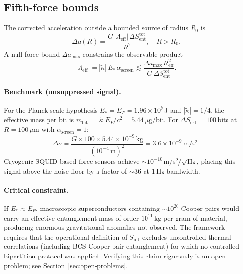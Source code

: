 \documentclass[11pt]{article}
\begin{document}
\subsection{Fifth-force bounds}

The corrected acceleration outside a bounded source of radius $R_0$ is
\begin{equation}
\Delta a(R) = \frac{G\,|\Lambda_{\mathrm{eff}}|\,\Delta S_{\mathrm{ent}}^{\mathrm{tot}}}{R^2},
\quad R > R_0.
\end{equation}
A null force bound $\Delta a_{\max}$ constrains the observable product
\begin{equation}
|\Lambda_{\mathrm{eff}}|
= |\tilde{\kappa}|\,E_*\,\alpha_{\mathrm{screen}}
\lesssim \frac{\Delta a_{\max}\,R_{\mathrm{eff}}^2}{G\,\Delta S_{\mathrm{ent}}^{\mathrm{tot}}}.
\label{eq:Lambda-bound}
\end{equation}

\paragraph{Benchmark (unsuppressed signal).}
For the Planck-scale hypothesis $E_* = E_P = 1.96\times10^9$\,J and $|\tilde{\kappa}| = 1/4$, the
effective mass per bit is $m_{\mathrm{bit}} = |\tilde{\kappa}|E_P/c^2 = 5.44\,\mu\mathrm{g/bit}$.
For $\Delta S_{\mathrm{ent}} = 100$\,bits at $R = 100\,\mu\mathrm{m}$ with $\alpha_{\mathrm{screen}} = 1$:
\begin{equation}
\Delta a
= \frac{G \times 100 \times 5.44\times10^{-9}\,\mathrm{kg}}{(10^{-4}\,\mathrm{m})^2}
= 3.6\times10^{-9}\,\mathrm{m/s^2}.
\end{equation}
Cryogenic SQUID-based force sensors achieve $\sim 10^{-10}$\,m/s$^2$/\hspace{0.5pt}$\sqrt{\mathrm{Hz}}$,
placing this signal above the noise floor by a factor of $\sim\!36$ at 1\,Hz bandwidth.

\paragraph{Critical constraint.}
If $E_* \approx E_P$, macroscopic superconductors containing $\sim\!10^{20}$ Cooper pairs would
carry an effective entanglement mass of order $10^{11}$\,kg per gram of material, producing
enormous gravitational anomalies not observed. The framework requires that the operational
definition of $S_{\mathrm{int}}$ excludes uncontrolled thermal correlations (including BCS
Cooper-pair entanglement) for which no controlled bipartition protocol was applied. Verifying
this claim rigorously is an open problem; see Section~\ref{sec:open-problems}.
\end{document}
